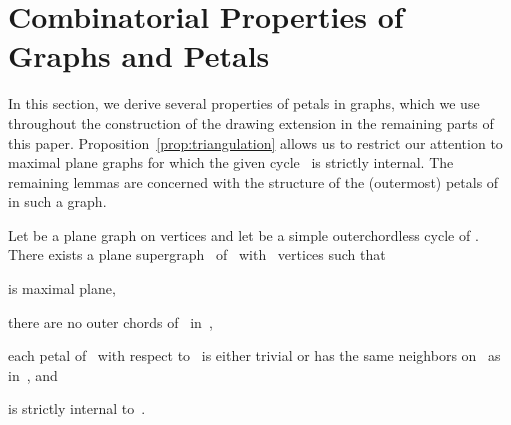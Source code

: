 \documentclass{llncs}
\begin{document}
\section{Combinatorial Properties of Graphs and Petals}
\label{sec:combinatorial}

In this section, we derive several properties of petals in graphs,
which we  use throughout the construction of the drawing extension
in the remaining parts of this paper. 
Proposition~\ref{prop:triangulation} allows us to restrict our
attention to maximal plane graphs for which the given cycle~ is
strictly internal. The remaining lemmas are concerned with the
structure of the (outermost) petals of~ in such a graph.

\begin{proposition}
  \label{prop:triangulation}
  Let  be a plane graph on  vertices and let  be a simple outerchordless cycle
  of .  There exists a plane supergraph~ of~
  with~ vertices such that
  \begin{inparaenum}[(i)]
  \item  is maximal plane,
  \item there are no outer chords of~ in~,
  \item each petal of~ with respect to~ is either trivial or
    has the same neighbors on~ as in~, and
  \item  is strictly internal to~.
  \end{inparaenum}
\end{proposition}
\end{document}
